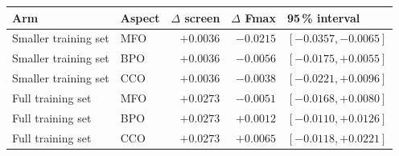 \begin{tabular}{llrrl}
\toprule
    \textbf{Arm} & \textbf{Aspect} & \textbf{$\Delta$ screen} & \textbf{$\Delta$ Fmax} & \textbf{95\,\% interval} \\
\midrule
    Smaller training set & MFO & $+0.0036$ & $-0.0215$ & $[-0.0357, -0.0065]$ \\
    Smaller training set & BPO & $+0.0036$ & $-0.0056$ & $[-0.0175, +0.0055]$ \\
    Smaller training set & CCO & $+0.0036$ & $-0.0038$ & $[-0.0221, +0.0096]$ \\
    Full training set & MFO & $+0.0273$ & $-0.0051$ & $[-0.0168, +0.0080]$ \\
    Full training set & BPO & $+0.0273$ & $+0.0012$ & $[-0.0110, +0.0126]$ \\
    Full training set & CCO & $+0.0273$ & $+0.0065$ & $[-0.0118, +0.0221]$ \\
\bottomrule
\end{tabular}
